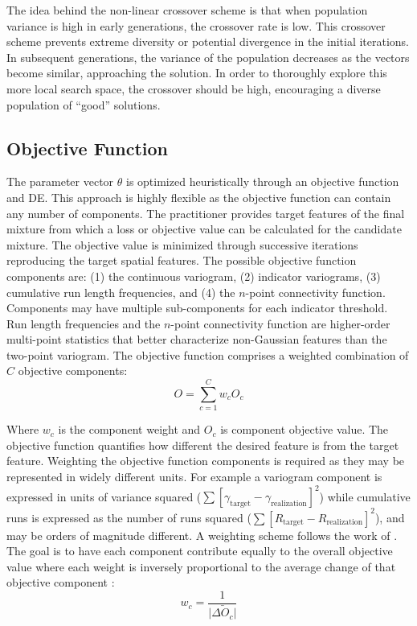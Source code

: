 The idea behind the non-linear crossover scheme is that when population variance is high in early generations, the crossover rate is low. This crossover scheme prevents extreme diversity or potential divergence in the initial iterations. In subsequent generations, the variance of the population decreases as the vectors become similar, approaching the solution. In order to thoroughly explore this more local search space, the crossover should be high, encouraging a diverse population of ``good'' solutions.

\subsection{Objective Function}
\label{subsec:04objfunc}

The parameter vector $\theta$ is optimized heuristically through an objective function and \gls{DE}. This approach is highly flexible as the objective function can contain any number of components. The practitioner provides target features of the final mixture from which a loss or objective value can be calculated for the candidate mixture. The objective value is minimized through successive iterations reproducing the target spatial features. The possible objective function components are: (1) the continuous variogram, (2) indicator variograms, (3) cumulative run length frequencies, and (4) the $n$-point connectivity function. Components may have multiple sub-components for each indicator threshold. Run length frequencies and the $n$-point connectivity function are higher-order multi-point statistics that better characterize non-Gaussian features than the two-point variogram. The objective function comprises a weighted combination of $C$ objective components:
\begin{equation}
    O = \sum_{c=1}^{C} w_{c}O_{c}
    \label{eq:fobj}
\end{equation}

Where $w_{c}$ is the component weight and $O_{c}$ is component objective value. The objective function quantifies how different the desired feature is from the target feature. Weighting the objective function components is required as they may be represented in widely different units. For example a variogram component is expressed in units of variance squared ($\sum [ \gamma_{\text{target}} - \gamma_{\text{realization}}]^{2}$) while cumulative runs is expressed as the number of runs squared ($\sum [ R_{\text{target}} - R_{\text{realization}}]^{2}$), and may be orders of magnitude different. A weighting scheme follows the work of \cite{deutsch1992annealing}. The goal is to have each component contribute equally to the overall objective value where each weight is inversely proportional to the average change of that objective component \citep{deutsch1992annealing}:
\begin{equation}
    w_{c} = \frac{1}{\bar{|\Delta O_{c}|}}
    \label{eq:fobj_wt}
\end{equation}

